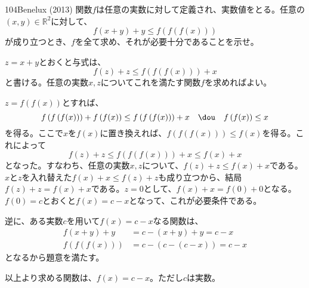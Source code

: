 \begin{thm}{104}{}{Benelux (2013)}
 関数$f$は任意の実数に対して定義され、実数値をとる。任意の$(x,y)\in\mathbb{R}^2$に対して、
 \[ f(x+y)+y \leq f\left(f\left(f(x)\right)\right) \]
 が成り立つとき、$f$を全て求め、それが必要十分であることを示せ。
\end{thm}

$z=x+y$とおくと与式は、
\[ f(z)+z \le f\left(f\left(f(x)\right)\right)+x \]
と書ける。任意の実数$x, z$についてこれを満たす関数$f$を求めればよい。

$z=f\left(f(x)\right)$とすれば、
\[ f\left(f\left(f(x)\right)\right)+f\left(f(x)\right)\le f\left(f\left(f(x)\right)\right)+x \quad\dou\quad f\left(f(x)\right)\le x \]
を得る。ここで$x$を$f(x)$に置き換えれば、$f\left(f\left(f(x)\right)\right) \le f(x)$を得る。これによって
\[ f(z)+z \le f\left(f\left(f(x)\right)\right)+x \le f(x)+x \]
となった。すなわち、任意の実数$x, z$について、$f(z)+z\le f(x)+x$である。$x$と$z$を入れ替えた$f(x)+x\le f(z)+z$も成り立つから、結局$f(z)+z=f(x)+x$である。$z=0$として、$f(x)+x=f(0)+0$となる。$f(0)=c$とおくと$f(x)=c-x$となって、これが必要条件である。

逆に、ある実数$c$を用いて$f(x)=c-x$なる関数は、
\begin{align*}
 f(x+y)+y&=c-(x+y)+y=c-x \\
 f\left(f\left(f(x)\right)\right)&=c-\left(c-\left(c-x\right)\right)=c-x
\end{align*}
となるから題意を満たす。

以上より求める関数は、$f(x)=c-x$。ただし$c$は実数。
